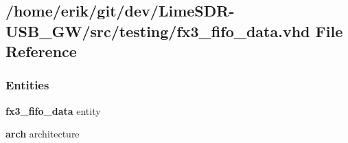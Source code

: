 \subsection{/home/erik/git/dev/\+Lime\+S\+D\+R-\/\+U\+S\+B\+\_\+\+G\+W/src/testing/fx3\+\_\+fifo\+\_\+data.vhd File Reference}
\label{fx3__fifo__data_8vhd}
\subsubsection*{Entities}
\begin{DoxyCompactItemize}
\item 
{\bf fx3\+\_\+fifo\+\_\+data} entity
\item 
{\bf arch} architecture
\end{DoxyCompactItemize}
